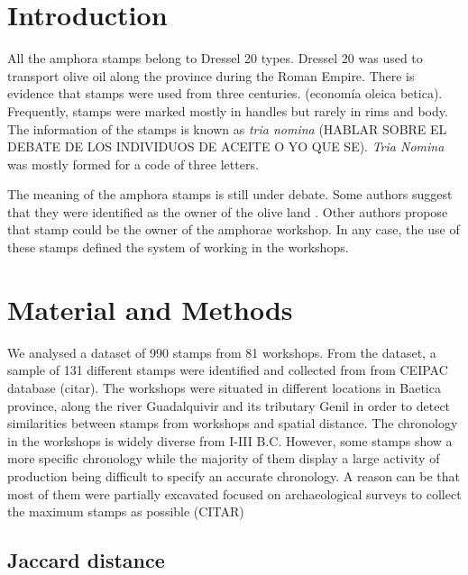 \documentclass[review]{elsarticle}
\begin{document}
\section{Introduction}


All the amphora stamps belong to Dressel 20 types. Dressel 20 was used to transport olive oil along the province during the Roman Empire. There is evidence that stamps were used from three centuries. (economía oleica betica). Frequently, stamps were marked mostly in handles but rarely in rims and body.  
The information of the stamps is known as \textit{tria nomina} (HABLAR SOBRE EL DEBATE DE LOS INDIVIDUOS DE ACEITE O YO QUE SE). \textit{Tria Nomina} was mostly formed for a code of three letters. 

The meaning of the amphora stamps is still under debate. Some authors suggest that they were identified as the owner of the olive land \citep{rodriguez_economioleicola_1977}. Other authors propose that stamp could be the owner of the amphorae workshop. In any case, the use of these stamps defined the system of working in the workshops. 

\section{Material and Methods}

We analysed a dataset of 990 stamps from 81 workshops. From the dataset, a sample of 131 different stamps were identified and collected from from CEIPAC database (citar). The workshops were situated in different locations in Baetica province, along the river Guadalquivir and its tributary Genil in order to detect similarities between stamps from workshops and spatial distance. The chronology in the workshops is widely diverse from I-III B.C. However, some stamps show a more specific chronology while the majority of them display a large activity of production being difficult to specify an accurate chronology. A reason can be that most of them were partially excavated focused on archaeological surveys to collect the maximum stamps as possible (CITAR) 



\subsection{Jaccard distance}
\end{document}
